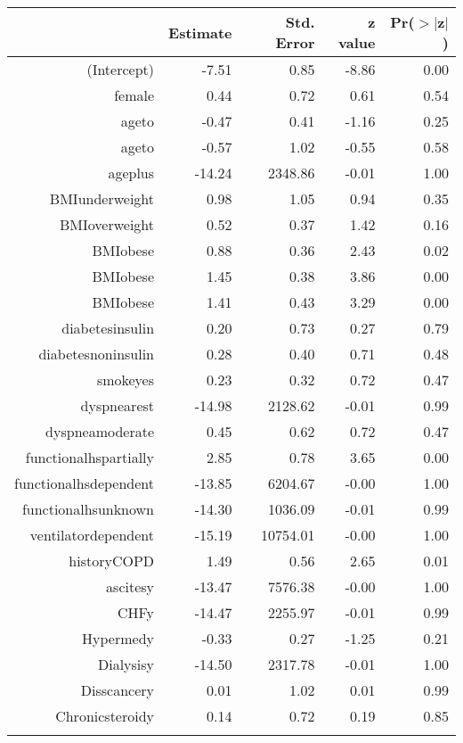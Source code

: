 \bigskip\bigskip
\centering
\begin{tabular}{rrrrr}
  \hline
 & Estimate & Std. Error & z value & Pr($>$$|$z$|$) \\ 
  \hline
(Intercept) & -7.51 & 0.85 & -8.86 & 0.00 \\ 
  female & 0.44 & 0.72 & 0.61 & 0.54 \\ 
  age\-65\-to\-74 & -0.47 & 0.41 & -1.16 & 0.25 \\ 
  age\-75\-to\-84 & -0.57 & 1.02 & -0.55 & 0.58 \\ 
  age\-85\-plus & -14.24 & 2348.86 & -0.01 & 1.00 \\ 
  BMI\-underweight & 0.98 & 1.05 & 0.94 & 0.35 \\ 
  BMI\-overweight & 0.52 & 0.37 & 1.42 & 0.16 \\ 
  BMI\-obese\-1 & 0.88 & 0.36 & 2.43 & 0.02 \\ 
  BMI\-obese\-2 & 1.45 & 0.38 & 3.86 & 0.00 \\ 
  BMI\-obese\-3 & 1.41 & 0.43 & 3.29 & 0.00 \\ 
  diabetes\-insulin & 0.20 & 0.73 & 0.27 & 0.79 \\ 
  diabetes\-noninsulin & 0.28 & 0.40 & 0.71 & 0.48 \\ 
  smoke\-yes & 0.23 & 0.32 & 0.72 & 0.47 \\ 
  dyspnea\-rest & -14.98 & 2128.62 & -0.01 & 0.99 \\ 
  dyspnea\-moderate & 0.45 & 0.62 & 0.72 & 0.47 \\ 
  functional\-hs\-partially & 2.85 & 0.78 & 3.65 & 0.00 \\ 
  functional\-hs\-dependent & -13.85 & 6204.67 & -0.00 & 1.00 \\ 
  functional\-hs\-unknown & -14.30 & 1036.09 & -0.01 & 0.99 \\ 
  ventilator\-dependent & -15.19 & 10754.01 & -0.00 & 1.00 \\ 
  history\-COPD & 1.49 & 0.56 & 2.65 & 0.01 \\ 
  ascites\-y & -13.47 & 7576.38 & -0.00 & 1.00 \\ 
  CHF\-y & -14.47 & 2255.97 & -0.01 & 0.99 \\ 
  Hyper\-med\-y & -0.33 & 0.27 & -1.25 & 0.21 \\ 
  Dialysis\-y & -14.50 & 2317.78 & -0.01 & 1.00 \\ 
  Diss\-cancer\-y & 0.01 & 1.02 & 0.01 & 0.99 \\ 
  Chronic\-steroid\-y & 0.14 & 0.72 & 0.19 & 0.85 \\ 
$$
\end{tabular}
